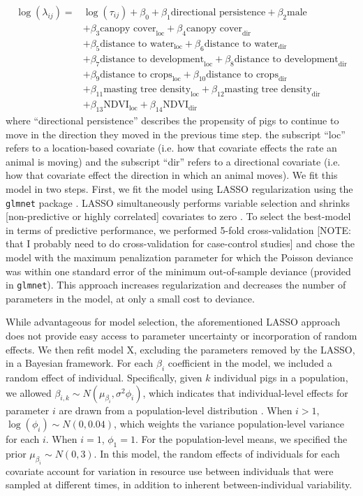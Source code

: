 \documentclass[a4paper]{article}
\begin{document}
\begin{align}
  \log(\lambda_{ij}) = & \log(\tau_{ij}) + \beta_0 +  \beta_1 \text{directional persistence} + \beta_2 \text{male  } \\
  & + \beta_{3} \text{canopy cover}_{\text{loc}} + \beta_{4} \text{canopy cover}_{\text{dir}} \\
  & + \beta_5 \text{distance to water}_{\text{loc}} + \beta_6 \text{distance to water}_{\text{dir}} \\
  & + \beta_7 \text{distance to development}_{\text{loc}} + \beta_8 \text{distance to development}_{\text{dir}} \\
  & + \beta_9\text{distance to crops}_{\text{loc}} + \beta_{10}\text{distance to crops}_{\text{dir}} \\
  & + \beta_{11}\text{masting tree density}_{\text{loc}} + \beta_{12}\text{masting tree density}_{\text{dir}} \\
  & + \beta_{13}\text{NDVI}_{\text{loc}} + \beta_{14}\text{NDVI}_{\text{dir}}
\end{align}
where ``directional persistence'' describes the propensity of pigs to continue to move in the direction they moved in the previous time step.  the subscript ``loc'' refers to a location-based covariate (i.e. how that covariate effects the rate an animal is moving) and the subscript ``dir'' refers to a directional covariate (i.e. how that covariate effect the direction in which an animal moves).  We fit this model in two steps.  First, we fit the model using LASSO regularization using the \texttt{glmnet} package \citep{Friedman2010}.  LASSO simultaneously performs variable selection and shrinks [non-predictive or highly correlated] covariates to zero \cite{James2013}.  To select the best-model in terms of predictive performance, we performed 5-fold cross-validation [NOTE: that I probably need to do cross-validation for case-control studies] and chose the model with the maximum penalization parameter for which the Poisson deviance was within one standard error of the minimum out-of-sample deviance (provided in \texttt{glmnet}). This approach increases regularization and decreases the number of parameters in the model, at only a small cost to deviance. 

While advantageous for model selection, the aforementioned LASSO approach does not provide easy access to parameter uncertainty or incorporation of random effects.  We then refit model X, excluding the parameters removed by the LASSO, in a Bayesian framework. For each $\beta_i$ coefficient in the model, we included a random effect of individual. Specifically, given $k$ individual pigs in a population, we allowed $\beta_{i,k} \sim N(\mu_{\beta_i}, \sigma^2 \phi_i)$, which indicates that individual-level effects for parameter $i$ are drawn from a population-level distribution \citep{Buderman2018}. When $i > 1$, $\log(\phi_i) \sim N(0, 0.04)$, which weights the variance population-level variance for each $i$. When $i = 1$, $\phi_1 = 1$. For the population-level means, we specified the prior $\mu_{\beta_i} \sim N(0, 3)$.  In this model, the random effects of individuals for each covariate account for variation in resource use between individuals that were sampled at different times, in addition to inherent between-individual variability.  
\end{document}
